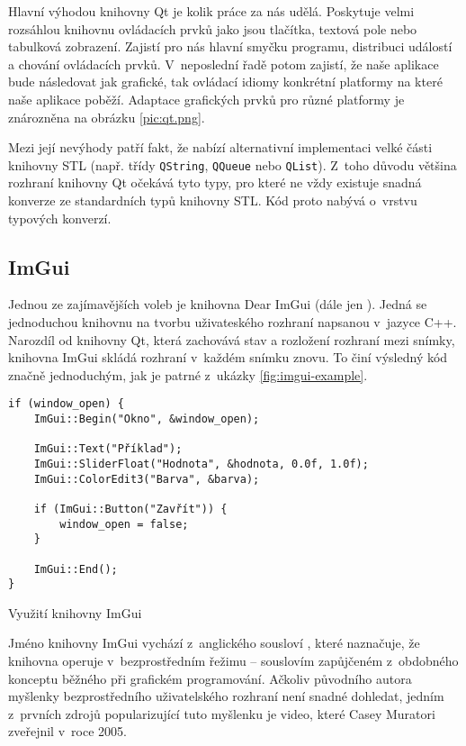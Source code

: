 Hlavní výhodou knihovny Qt je kolik práce za nás udělá. Poskytuje velmi rozsáhlou knihovnu ovládacích prvků jako jsou tlačítka, textová pole nebo tabulková zobrazení. Zajistí pro nás hlavní smyčku programu, distribuci událostí a chování ovládacích prvků. V~neposlední řadě potom zajistí, že naše aplikace bude následovat jak grafické, tak ovládací idiomy konkrétní platformy na které naše aplikace poběží. Adaptace grafických prvků pro různé platformy je znározněna na obrázku \ref{pic:qt.png}.


Mezi její nevýhody patří fakt, že nabízí alternativní implementaci velké části knihovny STL (např. třídy \texttt{QString}, \texttt{QQueue} nebo \texttt{QList}). Z~toho důvodu většina rozhraní knihovny Qt očekává tyto typy, pro které ne vždy existuje snadná konverze ze standardních typů knihovny STL. Kód proto nabývá o~vrstvu typových konverzí.

\subsection{ImGui}

Jednou ze zajímavějších voleb je knihovna Dear ImGui\cite{github-imgui} (dále jen ). Jedná se jednoduchou knihovnu na tvorbu uživateského rozhraní napsanou v~jazyce C++. Narozdíl od knihovny Qt, která zachovává stav a rozložení rozhraní mezi snímky, knihovna ImGui skládá rozhraní v~každém snímku znovu. To činí výsledný kód značně jednoduchým, jak je patrné z~ukázky \ref{fig:imgui-example}.

\begin{listing}[htbp]
\begin{verbatim}
if (window_open) {
    ImGui::Begin("Okno", &window_open);

    ImGui::Text("Příklad");
    ImGui::SliderFloat("Hodnota", &hodnota, 0.0f, 1.0f);
    ImGui::ColorEdit3("Barva", &barva);
    
    if (ImGui::Button("Zavřít")) {
        window_open = false;
    }

    ImGui::End();
}
\end{verbatim}
\caption{Využití knihovny ImGui}
\label{fig:imgui-example}
\end{listing}

Jméno knihovny ImGui vychází z~anglického sousloví , které naznačuje, že knihovna operuje v~bezprostředním řežimu -- souslovím zapůjčeném z~obdobného konceptu běžného při grafickém programování. Ač\-ko\-liv původního autora myšlenky bezprostředního uživatelského rozhraní není snad\-né dohledat, jedním z~prvních zdrojů popularizující tuto myšlenku je video, které Casey Muratori zveřejnil v~roce 2005\cite{casey-imgui}.

